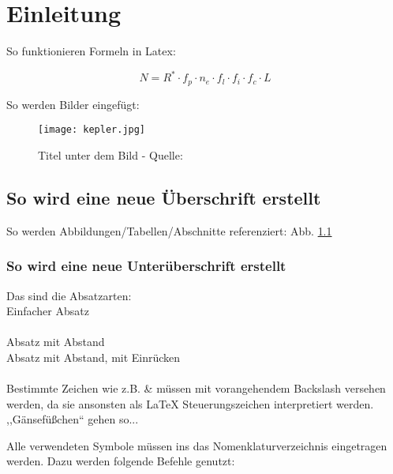 \chapter{Einleitung}

So funktionieren Formeln in Latex:
\begin{center}
	\begin{equation}
		N = R^{*} \cdot f_{p} \cdot n_{e} \cdot f_{l} \cdot f_{i} \cdot f_{c} \cdot L 
	\end{equation}
\end{center}

\noindent So werden Bilder eingefügt:\\

\begin{figure}[h] %
	\centering
	\label{figure:kepler}
	\texttt{[image: kepler.jpg]} %
	\caption[Kepler (Titel im Abk.-Verzeichnis)]{Titel unter dem Bild - Quelle: \cite{key}}
\end{figure}

\section{So wird eine neue Überschrift erstellt}
So werden Abbildungen/Tabellen/Abschnitte referenziert: Abb. \ref{figure:kepler}\\

\subsection{So wird eine neue Unterüberschrift erstellt}
Das sind die Absatzarten:\\
Einfacher Absatz\\\\
Absatz mit Abstand\\

Absatz mit Abstand, mit Einrücken\\\\

\noindent Bestimmte Zeichen wie z.B. \& müssen mit vorangehendem Backslash versehen werden, da sie ansonsten als LaTeX Steuerungszeichen interpretiert werden. ,,Gänsefüßchen`` gehen so...

\newpage

Alle verwendeten Symbole müssen ins das Nomenklaturverzeichnis eingetragen werden. Dazu werden folgende Befehle genutzt:




